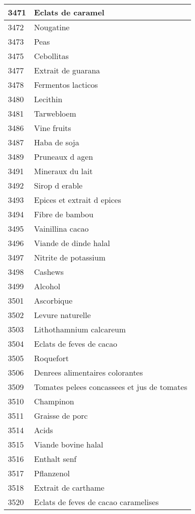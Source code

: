 \begin{longtable}{|l|l|}
3471 & Eclats de caramel \\ \hline 
3472 & Nougatine \\ \hline 
3473 & Peas \\ \hline 
3475 & Cebollitas \\ \hline 
3477 & Extrait de guarana \\ \hline 
3478 & Fermentos lacticos \\ \hline 
3480 & Lecithin \\ \hline 
3481 & Tarwebloem \\ \hline 
3486 & Vine fruits \\ \hline 
3487 & Haba de soja \\ \hline 
3489 & Pruneaux d agen \\ \hline 
3491 & Mineraux du lait \\ \hline 
3492 & Sirop d erable \\ \hline 
3493 & Epices et extrait d epices \\ \hline 
3494 & Fibre de bambou \\ \hline 
3495 & Vainillina cacao \\ \hline 
3496 & Viande de dinde halal \\ \hline 
3497 & Nitrite de potassium \\ \hline 
3498 & Cashews \\ \hline 
3499 & Alcohol \\ \hline 
3501 & Ascorbique \\ \hline 
3502 & Levure naturelle \\ \hline 
3503 & Lithothamnium calcareum \\ \hline 
3504 & Eclats de feves de cacao \\ \hline 
3505 & Roquefort \\ \hline 
3506 & Denrees alimentaires colorantes \\ \hline 
3509 & Tomates pelees concassees et jus de tomates \\ \hline 
3510 & Champinon \\ \hline 
3511 & Graisse de porc \\ \hline 
3514 & Acids \\ \hline 
3515 & Viande bovine halal \\ \hline 
3516 & Enthalt senf \\ \hline 
3517 & Pflanzenol \\ \hline 
3518 & Extrait de carthame \\ \hline 
3520 & Eclats de feves de cacao caramelises \\ \hline 

\end{longtable}
